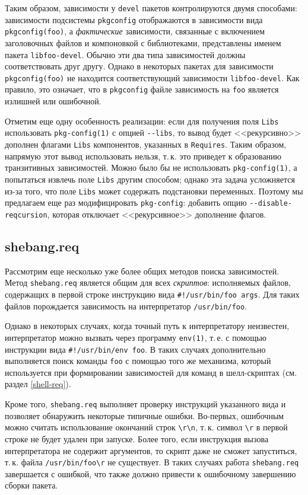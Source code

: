 \documentclass[russian,a4paper,12pt,titlepage]{article}
\begin{document}
Таким образом, зависимости у \verb|devel| пакетов контролируются двумя способами: зависимости подсистемы
\verb|pkgconfig| отображаются в зависимости вида \verb|pkgconfig(foo)|, а \emph{фактические} зависимости,
связанные с включением заголовочных файлов и компоновкой с библиотеками, представлены именем пакета \verb|libfoo-devel|.
Обычно эти два типа зависимостей должны соответствовать друг другу.  Однако в некоторых пакетах для зависимости
\verb|pkgconfig(foo)| не находится соответствующий зависимости \verb|libfoo-devel|.  Как правило, это означает,
что в \verb|pkgconfig| файле зависимость на \verb|foo| является излишней или ошибочной.

Отметим еще одну особенность реализации: если для получения поля \verb|Libs| использовать \verb|pkg-config(1)|
с опцией \verb|--libs|, то вывод будет <<рекурсивно>> дополнен флагами \verb|Libs| компонентов, указанных
в \verb|Requires|.  Таким образом, напрямую этот вывод использовать нельзя, т.\,к. это приведет к образованию
транзитивных зависимостей.  Можно было бы не использовать \verb|pkg-config(1)|, а попытаться извлечь поле \verb|Libs|
другим способом; однако эта задача усложняется из-за того, что поле \verb|Libs| может содержать подстановки переменных.
Поэтому мы предлагаем еще раз модифицировать \verb|pkg-config|: добавить опцию \verb|--disable-reqcursion|, которая
отключает <<рекурсивное>> дополнение флагов.

\subsection{shebang.req}
\label{shebang-req}
Рассмотрим еще несколько уже более общих методов поиска зависимостей.
Метод \verb|shebang.req| является общим для всех \emph{скриптов}: исполняемых файлов, содержащих в первой строке
инструкцию вида \verb|#!/usr/bin/foo args|.  Для таких файлов порождается зависимость на интерпретатор \verb|/usr/bin/foo|.

Однако в некоторых случаях, когда точный путь к интерпретатору неизвестен, интерпретатор можно вызвать через
программу \verb|env(1)|, т.\,е. с помощью инструкции вида \verb|#!/usr/bin/env foo|.  В таких случаях дополнительно
выполняется поиск команды \verb|foo| с помощью того же механизма, который используется при формировании зависимостей
для команд в шелл-скриптах (см. раздел \ref{shell-req}).

Кроме того, \verb|shebang.req| выполняет проверку инструкций указанного вида и позволяет обнаружить некоторые типичные ошибки.
Во-первых, ошибочным можно считать использование окончаний строк \verb|\r\n|, т.\,к. символ \verb|\r| в первой строке
не будет удален при запуске.  Более того, если инструкция вызова интерпретатора не содержит аргументов, то скрипт даже не сможет
запуститься, т.\,к. файла \verb|/usr/bin/foo\r| не существует.  В таких случаях работа \verb|shebang.req| завершается с ошибкой,
что также должно привести к ошибочному завершению сборки пакета.
\end{document}
